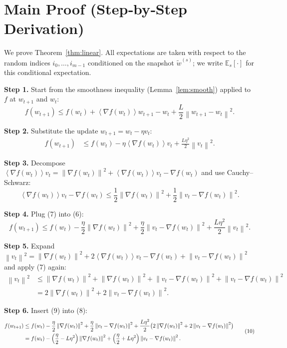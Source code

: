 \documentclass[11pt]{article}
\newcommand{\E}{\mathbb{E}}
\newcommand{\norm}[1]{\left\|#1\right\|}
\newcommand{\inner}[1]{\left\langle#1\right\rangle}
\begin{document}
\section*{Main Proof (Step‑by‑Step Derivation)}
We prove Theorem~\ref{thm:linear}.  
All expectations are taken with respect to the random indices $i_0,\dots,i_{m-1}$ conditioned on the snapshot $\tilde w^{(s)}$; we write $\E_s[\cdot]$ for this conditional expectation.

\noindent\textbf{Step 1.}  Start from the smoothness inequality (Lemma~\ref{lem:smooth}) applied to $f$ at $w_{t+1}$ and $w_t$:
\[
f(w_{t+1})\le f(w_t)+\inner{\nabla f(w_t)}{w_{t+1}-w_t}
+\frac{L}{2}\norm{w_{t+1}-w_t}^2 .
\tag{5}
\]

\noindent\textbf{Step 2.}  Substitute the update $w_{t+1}=w_t-\eta v_t$:
\[
\begin{aligned}
f(w_{t+1})
&\le f(w_t)-\eta\inner{\nabla f(w_t)}{v_t}
+\frac{L\eta^{2}}{2}\norm{v_t}^{2}.
\tag{6}
\end{aligned}
\]

\noindent\textbf{Step 3.}  Decompose $\inner{\nabla f(w_t)}{v_t}
= \norm{\nabla f(w_t)}^{2}+\inner{\nabla f(w_t)}{v_t-\nabla f(w_t)}$ and use Cauchy–Schwarz:
\[
\inner{\nabla f(w_t)}{v_t-\nabla f(w_t)}
\le \frac{1}{2}\norm{\nabla f(w_t)}^{2}
     +\frac{1}{2}\norm{v_t-\nabla f(w_t)}^{2}.
\tag{7}
\]

\noindent\textbf{Step 4.}  Plug (7) into (6):
\[
f(w_{t+1})\le f(w_t)-\frac{\eta}{2}\norm{\nabla f(w_t)}^{2}
            +\frac{\eta}{2}\norm{v_t-\nabla f(w_t)}^{2}
            +\frac{L\eta^{2}}{2}\norm{v_t}^{2}.
\tag{8}
\]

\noindent\textbf{Step 5.}  Expand $\norm{v_t}^{2}=\norm{\nabla f(w_t)}^{2}
+2\inner{\nabla f(w_t)}{v_t-\nabla f(w_t)}+\norm{v_t-\nabla f(w_t)}^{2}$ and apply (7) again:
\[
\begin{aligned}
\norm{v_t}^{2}
&\le \norm{\nabla f(w_t)}^{2}
   + \norm{\nabla f(w_t)}^{2}
   + \norm{v_t-\nabla f(w_t)}^{2}
   + \norm{v_t-\nabla f(w_t)}^{2}\\
&=2\norm{\nabla f(w_t)}^{2}+2\norm{v_t-\nabla f(w_t)}^{2}.
\end{aligned}
\tag{9}
\]

\noindent\textbf{Step 6.}  Insert (9) into (8):
\[
\begin{aligned}
f(w_{t+1})
&\le f(w_t)-\frac{\eta}{2}\norm{\nabla f(w_t)}^{2}
   +\frac{\eta}{2}\norm{v_t-\nabla f(w_t)}^{2}
   +\frac{L\eta^{2}}{2}\bigl(2\norm{\nabla f(w_t)}^{2}
                         +2\norm{v_t-\nabla f(w_t)}^{2}\bigr)\\
&= f(w_t)-\Bigl(\frac{\eta}{2}-L\eta^{2}\Bigr)\norm{\nabla f(w_t)}^{2}
   +\Bigl(\frac{\eta}{2}+L\eta^{2}\Bigr)\norm{v_t-\nabla f(w_t)}^{2}.
\end{aligned}
\tag{10}
\]
\end{document}
